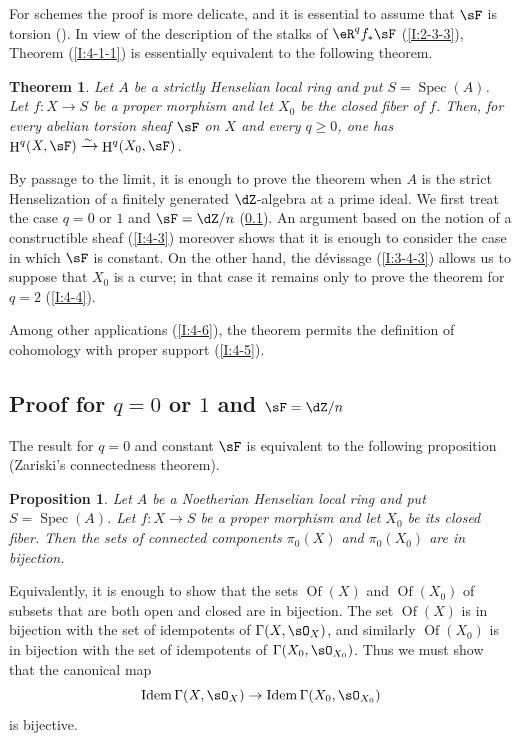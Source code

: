 \documentclass[12pt,oneside,english]{smfbook}
\DeclareMathOperator{\h}{H}
\DeclareMathOperator{\spec}{Spec}
\newcommand{\iso}{\xrightarrow\sim}
\newtheorem{proposition}[subsubsection]{Proposition}
\newtheorem{theorem}[subsubsection]{Theorem}
\begin{document}
For schemes the proof is more delicate, and it is essential to assume that $\sF$ is torsion (\cite[XII.2]{sga4}). In view of the description of the stalks of $\eR^qf_*\sF$ (\ref{I:2-3-3}), Theorem (\ref{I:4-1-1}) is essentially equivalent to the following theorem.

\begin{theorem}\label{I:4-1-2}
Let $A$ be a strictly Henselian local ring and put $S=\spec(A)$. Let $f:X\to S$ be a proper morphism and let $X_0$ be the closed fiber of $f$. Then, for every abelian torsion sheaf $\sF$ on $X$ and every $q\geqslant0$, one has $\h^q(X,\sF)\iso\h^q(X_0,\sF)$.
\end{theorem}

By passage to the limit, it is enough to prove the theorem when $A$ is the strict Henselization of a finitely generated $\dZ$-algebra at a prime ideal. We first treat the case $q=0$ or $1$ and $\sF=\dZ/n$ (\ref{I:4-2}). An argument based on the notion of a constructible sheaf (\ref{I:4-3}) moreover shows that it is enough to consider the case in which $\sF$ is constant. On the other hand, the dévissage (\ref{I:3-4-3}) allows us to suppose that $X_0$ is a curve; in that case it remains only to prove the theorem for $q=2$ (\ref{I:4-4}).

Among other applications (\ref{I:4-6}), the theorem permits the definition of cohomology with proper support (\ref{I:4-5}).

\subsection{Proof for \texorpdfstring{$q=0$}{q=0} or \texorpdfstring{$1$}{1} and \texorpdfstring{$\sF=\dZ/n$}{\sF=Z/n}}\label{I:4-2}

The result for $q=0$ and constant $\sF$ is equivalent to the following proposition (Zariski's connectedness theorem).

\begin{proposition}\label{I:4-2-1}
Let $A$ be a Noetherian Henselian local ring and put $S=\spec(A)$. Let $f:X\to S$ be a proper morphism and let $X_0$ be its closed fiber. Then the sets of connected components $\pi_0(X)$ and $\pi_0(X_0)$ are in bijection.
\end{proposition}

Equivalently, it is enough to show that the sets $\operatorname{Of}(X)$ and $\operatorname{Of}(X_0)$ of subsets that are both open and closed are in bijection. The set $\operatorname{Of}(X)$ is in bijection with the set of idempotents of $\Gamma(X,\sO_X)$, and similarly $\operatorname{Of}(X_0)$ is in bijection with the set of idempotents of $\Gamma(X_0,\sO_{X_0})$. Thus we must show that the canonical map
\[
  \operatorname{Idem} \Gamma(X,\sO_X) \to \operatorname{Idem}\Gamma(X_0,\sO_{X_0})
\]
is bijective.
\end{document}
